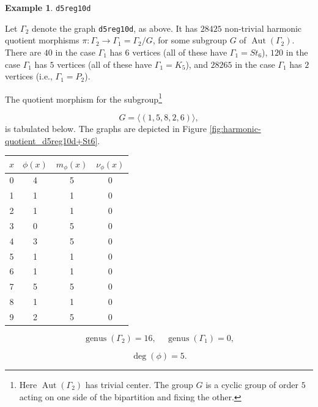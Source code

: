 \documentclass[12pt,letterpaper]{article}
\theoremstyle{definition}
\newtheorem{example}[theorem]{Example}
\DeclareMathOperator{\Aut}{Aut}
\DeclareMathOperator{\genus}{genus}
\begin{document}
\begin{example}%
\label{example:d5reg10d}
  {\tt d5reg10d}\newline
{\rm  
  Let $\Gamma_2$ denote the graph {\tt d5reg10d}, as above.
It has $28425$  non-trivial harmonic quotient morphisms
$\pi: \Gamma_2\to \Gamma_1=\Gamma_2/G$,
for some subgroup $G$ of $\Aut(\Gamma_2)$.
There are $40$ in the case $\Gamma_1$ has $6$ vertices
(all of these have $\Gamma_1=St_6$),
$120$ in the case $\Gamma_1$ has $5$ vertices
(all of these have $\Gamma_1=K_5$),
and $28265$ in the case $\Gamma_1$ has $2$ vertices
(i.e., $\Gamma_1=P_2$).

The quotient morphism for the
subgroup\footnote{Here $\Aut(\Gamma_2)$ has trivial center. The group $G$ is a cyclic
group of order $5$ acting on one side of the bipartition and fixing the other.}

\[
G=\langle (1,5,8,2,6) \rangle,
\]
is tabulated below. The graphs are depicted in
Figure \ref{fig:harmonic-quotient_d5reg10d+St6}.

\begin{center}
\begin{tabular}{c|c|c|c}  
  $x$ & $\phi(x)$ & $m_\phi(x)$ & $\nu_\phi(x)$ \\ \hline
  0   &    4   &        5         &  0   \\ 
  1   &    1   &        1         &  0  \\ 
  2   &    1   &        1         &  0  \\ 
  3   &    0   &        5         &  0  \\ 
  4   &    3   &        5         &  0   \\ 
  5   &    1   &        1         &  0    \\ 
  6   &    1   &        1         &  0   \\ 
  7   &    5   &        5         &  0   \\
  8   &    1   &        1         &  0   \\
  9   &    2   &        5         &  0   \\
\end{tabular}
\end{center}

\[
  \genus(\Gamma_2) =16,\ \ \ \ \
  \genus(\Gamma_1) =0,
\]

\[
\deg(\phi) =5.
\]

}
\end{example}
\end{document}
